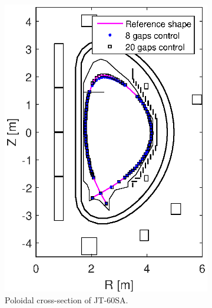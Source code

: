 \begin{figure}[h]
	\centering
	\begin{subfigure}[b]{0.32\textwidth}
		\includegraphics[width=\textwidth] {Chp3/Ref_20gaps_8gaps_minor_2.eps}  
		\caption{Poloidal cross-section of JT-60SA.\label{figure:minor_big} }
	\end{subfigure}
	~
	\begin{subfigure}[b]{0.32\textwidth}

\end{subfigure}
\end{figure}
